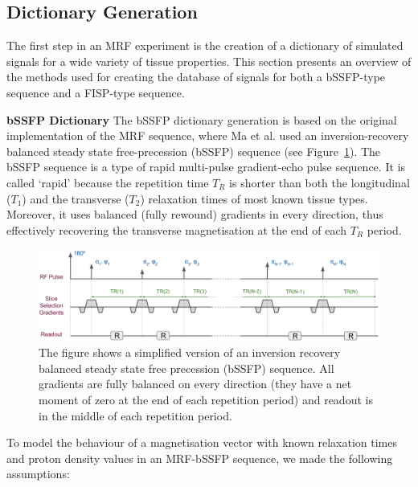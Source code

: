 \subsection{Dictionary Generation}
\label{method:dictionary}

The first step in an MRF experiment is the creation of a dictionary of simulated signals for a wide variety of tissue properties.
This section presents an overview of the methods used for creating the database of signals for both a bSSFP-type sequence and a FISP-type sequence.

\hfill

\large \textbf{bSSFP Dictionary} \normalsize
The bSSFP dictionary generation is based on the original implementation of the MRF sequence, where Ma et al. \cite{Ma2013} used an inversion-recovery balanced steady state free-precession (bSSFP) sequence (see Figure~\ref{fig:sequencebSSFP}). 
The bSSFP sequence is a type of rapid multi-pulse gradient-echo pulse sequence. 
It is called `rapid' because the repetition time $T_R$ is shorter than both the longitudinal ($T_1$) and the transverse ($T_2$) relaxation times of most known tissue types.
Moreover, it uses balanced (fully rewound) gradients in every direction, thus effectively recovering the transverse magnetisation at the end of each $T_R$ period.

\begin{figure}[ht]
    \centering
    \includegraphics[angle=0,width=1\textwidth, keepaspectratio]{images/mrf/sequencebSSFP}
    \caption{The figure shows a simplified version of an inversion recovery balanced steady state free precession (bSSFP) sequence. 
    All gradients are fully balanced on every direction (they have a net moment of zero at the end of each repetition period) and readout is in the middle of each repetition period.}
    \label{fig:sequencebSSFP}
\end{figure}

\hfill

To model the behaviour of a magnetisation vector with known relaxation times and proton density values in an MRF-bSSFP sequence, we made the following assumptions:


